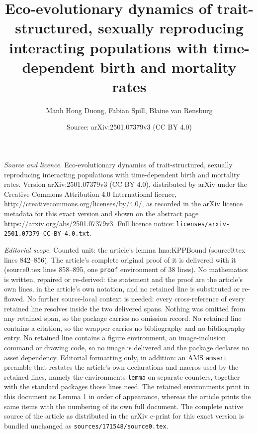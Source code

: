 \documentclass[10pt,a4paper]{amsart}
\title{Eco-evolutionary dynamics of trait-structured, sexually reproducing interacting populations with time-dependent birth and mortality rates}
\author{Manh Hong Duong, Fabian Spill, Blaine van Rensburg}
\date{Source: arXiv:2501.07379v3 (CC BY 4.0)}
\begin{document}
\maketitle

\noindent\emph{Source and licence.} Eco-evolutionary dynamics of trait-structured, sexually reproducing interacting populations with time-dependent birth and mortality rates. Version arXiv:2501.07379v3 (CC BY 4.0), distributed by arXiv under the Creative Commons Attribution 4.0 International licence, http://creativecommons.org/licenses/by/4.0/, as recorded in the arXiv licence metadata for this exact version and shown on the abstract page https://arxiv.org/abs/2501.07379v3. Full licence notice: \texttt{licenses/arxiv-2501.07379-CC-BY-4.0.txt}.\par\smallskip

\noindent\textit{Editorial scope.} Counted unit: the article's lemma lma:KPPBound (source0.tex lines 842--856). The article's complete original proof of it is delivered with it (source0.tex lines 858--895, one \texttt{proof} environment of 38 lines). No mathematics is written, repaired or re-derived: the statement and the proof are the article's own lines, in the article's own notation, and no retained line is substituted or re-flowed.  No further source-local context is needed: every cross-reference of every retained line resolves inside the two delivered spans.  Nothing was omitted from any retained span, so the package carries no omission record.  No retained line contains a citation, so the wrapper carries no bibliography and no bibliography entry.  No retained line contains a figure environment, an image-inclusion command or drawing code, so no image is delivered and the package declares no asset dependency.  Editorial formatting only, in addition: an AMS \texttt{amsart} preamble that restates the article's own declarations and macros used by the retained lines, namely the environments \texttt{lemma} on separate counters, together with the standard packages those lines need.  The retained environments print in this document as Lemma 1 in order of appearance, whereas the article prints the same items with the numbering of its own full document.  The complete native source of the article as distributed in the arXiv e-print for this exact version is bundled unchanged as \texttt{sources/171548/source0.tex}.
\end{document}
